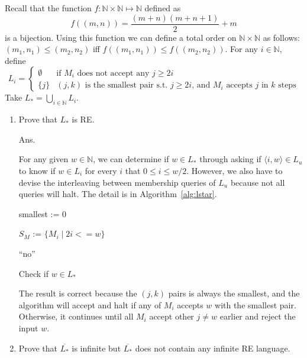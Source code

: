 \documentclass[11pt]{homework}
\newcommand{\Nat}{\ensuremath{\mathbb{N}}}
\begin{document}
Recall that the function \(f:\Nat \times \Nat \mapsto \Nat\) defined as
\[
f((m,n)) = \frac{(m+n)(m+n+1)}{2} + m
\]
is a bijection.
Using this function we can define a total order on \(\Nat \times \Nat\) as follows:
\((m_1,n_1)\leq (m_2,n_2)\) iff \(f((m_1,n_1))\leq f((m_2,n_2))\).
For any \(i \in \Nat\), define
\[
L_i =
\begin{cases}
\emptyset & \text{if } M_i \text{ does not accept any } j \geq 2i \\
\{j\}     & (j,k) \text{ is the smallest pair s.t. } j \geq 2i \text{, and } M_i \text{ accepts } j \text{ in } k \text{ steps}
\end{cases}
\]
Take \(L_* = \bigcup_{i\in\Nat} L_i\).

\begin{enumerate}[label=(\alph*), resume]
  \item Prove that \(L_*\) is RE.

Ans.

For any given \(w \in \Nat\), we can determine if \(w \in L_*\) through
asking if \(\langle i,w\rangle \in L_u\) to know if \(w \in L_i\) for every \(i\) that \( 0\leq i \leq w/2\).
However, we also have to devise the interleaving
between membership queries of \(L_u\) because not all queries will halt.
The detail is in Algorithm~\ref{alg:lstar}.

\begin{algorithm}
    \KwIn{\(w \in \Nat\)}
    
    smallest := 0
    
    \(S_M\) := \(\{M_i \mid 2i<=w\}\)

  
  \Return ``no''
  
   \caption{Check if \(w \in L_*\)}
   \label{alg:lstar}
\end{algorithm}

The result is correct because the \((j,k)\) pairs is always the smallest,
and the algorithm will accept and halt if any of \(M_i\) accepts \(w\) with the smallest pair.
Otherwise, it continues until all \(M_i\) accept other \(j \neq w\) earlier and reject the input \(w\).

  \item Prove that \(\overline{L_*}\) is infinite but \(\overline{L_*}\)
        does not contain any infinite RE language.


\end{enumerate}
\end{document}
